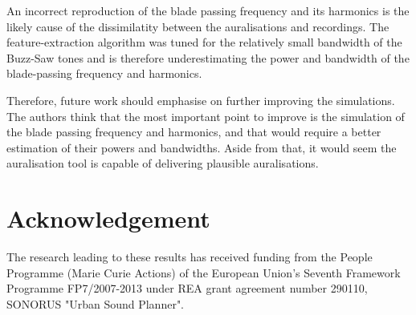 \documentclass[10pt,twocolumn]{article}
\begin{document}
An incorrect reproduction of the blade passing frequency and its harmonics is
the likely cause of the dissimilatity between the auralisations and recordings.
The feature-extraction algorithm was tuned for the relatively small bandwidth of
the Buzz-Saw tones and is therefore underestimating the power and bandwidth of
the blade-passing frequency and harmonics.

Therefore, future work should emphasise on further improving the simulations.
The authors think that the most important point to improve is the simulation of
the blade passing frequency and harmonics, and that would require a better
estimation of their powers and bandwidths. Aside from that, it would seem the
auralisation tool is capable of delivering plausible auralisations.

\section{Acknowledgement}
The research leading to these results has received funding from
the People Programme (Marie Curie Actions) of the European Union's Seventh
Framework Programme FP7/2007-2013 under REA grant agreement number 290110,
SONORUS "Urban Sound Planner".

\printbibliography[heading=bibintoc]
\end{document}
